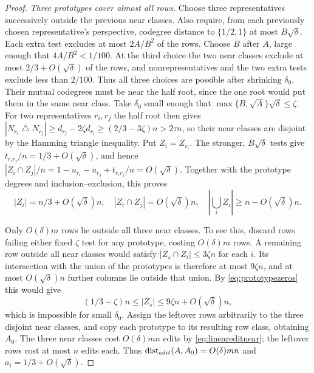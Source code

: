 \documentclass[10pt,a4paper]{amsart}
\begin{document}
\begin{proof}
\smallskip\noindent\emph{Three prototypes cover almost all rows.}
Choose three representatives successively outside the previous near
classes. Also require, from each previously chosen representative's
perspective, codegree distance to $\{1/2,1\}$ at most $B\sqrt\delta$.
Each extra test excludes at most $2A/B^2$ of the rows. Choose $B$ after
$A$, large enough that $4A/B^2<1/100$. At the third choice the two
near classes exclude at most $2/3+O(\sqrt\delta)$ of the rows, and
nonrepresentatives and the two extra tests exclude less than $2/100$.
Thus all three choices are possible after shrinking $\delta_0$.
Their mutual codegrees must be near the half root, since the
one root would put them in the same near class. Take $\delta_0$ small
enough that $\max\{B,\sqrt A\}\sqrt\delta\le\zeta$. For two representatives $r_i,r_j$ the
half root then gives
$|N_{r_i}\mathbin\triangle N_{r_j}|\ge d_{r_j}-2\zeta d_{r_i}\ge(2/3-3\zeta)n>2\tau n$,
so their near classes are disjoint by the Hamming triangle inequality.
Put $Z_i=Z_{r_i}$. The stronger, $B\sqrt\delta$ tests give
$t_{r_i r_j}/n=1/3+O(\sqrt\delta)$, and hence
$|Z_i\cap Z_j|/n=1-u_{r_i}-u_{r_j}+t_{r_i r_j}/n=O(\sqrt\delta)$.
Together with the prototype degrees and inclusion--exclusion, this proves
\begin{equation}\label{eq:prototypezeros}
 |Z_i|=n/3+O(\sqrt\delta)n,\quad
 |Z_i\cap Z_j|=O(\sqrt\delta)n,\quad
 |\bigcup_iZ_i|\ge n-O(\sqrt\delta)n.
\end{equation}

Only $O(\delta)m$ rows lie outside all three near classes.
To see this, discard rows failing either fixed $\zeta$ test for any
prototype, costing $O(\delta)m$ rows. A remaining row outside all near
classes would satisfy $|Z_s\cap Z_i|\le3\zeta n$ for each $i$.
Its intersection with the union of the prototypes is therefore at most
$9\zeta n$, and at most $O(\sqrt\delta)n$ further columns lie outside
that union. By \eqref{eq:prototypezeros} this would give
\[
 (1/3-\zeta)n\le|Z_s|\le9\zeta n+O(\sqrt\delta)n,
\]
which is impossible for small $\delta_0$.
Assign the leftover rows arbitrarily to the three disjoint near classes,
and copy each prototype to its resulting row class, obtaining $A_0$.
The three near classes cost $O(\delta)mn$ edits by
\eqref{eq:lineareditnear}; the leftover rows cost at most $n$ edits each.
Thus
$\operatorname{dist}_{\rm edit}(A,A_0)=O(\delta)mn$ and
$a_i=1/3+O(\sqrt\delta)$.


\end{proof}
\end{document}
